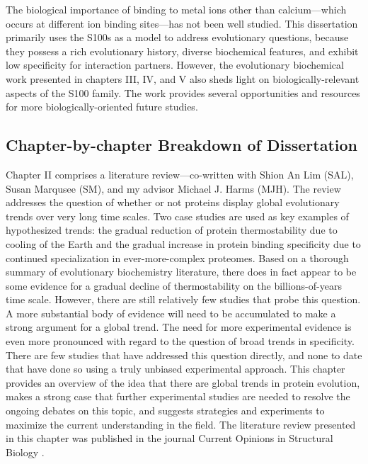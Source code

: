 The biological importance of binding to metal ions other than calcium---which
occurs at different ion binding sites---has not been well studied. This
dissertation primarily uses the S100s as a model to address evolutionary
questions, because they possess a rich evolutionary history, diverse
biochemical features, and exhibit low specificity for interaction
partners. However, the evolutionary biochemical work presented in
chapters III, IV, and V also sheds light on biologically-relevant
aspects of the S100 family. The work provides several opportunities
and resources for more biologically-oriented future studies. 

\subsection{Chapter-by-chapter Breakdown of Dissertation}

Chapter II comprises a literature review---co-written with Shion An
Lim (SAL), Susan Marqusee (SM), and my advisor Michael J. Harms (MJH).
The review addresses the question of whether or not proteins display
global evolutionary trends over very long time scales. Two case studies
are used as key examples of hypothesized trends: the gradual reduction
of protein thermostability due to cooling of the Earth and the gradual
increase in protein binding specificity due to continued specialization
in ever-more-complex proteomes. Based on a thorough summary of evolutionary
biochemistry literature, there does in fact appear to be some evidence
for a gradual decline of thermostability on the billions-of-years
time scale. However, there are still relatively few studies that probe
this question. A more substantial body of evidence will need to be
accumulated to make a strong argument for a global trend. The need
for more experimental evidence is even more pronounced with regard
to the question of broad trends in specificity. There are few studies
that have addressed this question directly, and none to date that
have done so using a truly unbiased experimental approach. This chapter
provides an overview of the idea that there are global trends in protein
evolution, makes a strong case that further experimental studies are
needed to resolve the ongoing debates on this topic, and suggests
strategies and experiments to maximize the current understanding in
the field. The literature review presented in this chapter was published
in the journal Current Opinions in Structural Biology \citep{wheeler_thermostability_2016}.


